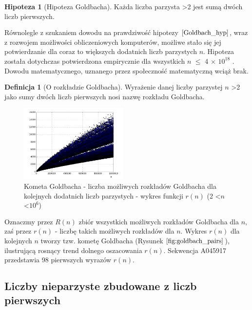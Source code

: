 \documentclass[10pt,onecolumn]{article}
\theoremstyle{definition}
\newtheorem{definition}{Definicja}
\theoremstyle{hypothesis}
\newtheorem{hypothesis}{Hipoteza}
\theoremstyle{capability}
\begin{document}
\begin{hypothesis}[Hipoteza Goldbacha]
Każda liczba parzysta \textgreater 2 jest sumą dwóch liczb pierwszych.
\label{Goldbach_hyp}
\end{hypothesis}

Równolegle z szukaniem dowodu na prawdziwość hipotezy $\ref{Goldbach_hyp}$, wraz z rozwojem możliwości obliczeniowych komputerów, możliwe stało się jej potwierdzanie dla coraz to większych dodatnich liczb parzystych $n$. Hipoteza została dotychczas potwierdzona empirycznie dla wszystkich $n$ $\leq$ 4 $\times$ $10^{18}$ \cite{oliveira2012}. Dowodu matematycznego, uznanego przez społeczność matematyczną wciąż brak.\par

\begin{definition} [O rozkładzie Goldbacha]
Wyrażenie danej liczby parzystej $n$ \textgreater 2 jako sumy dwóch liczb pierwszych nosi nazwę rozkładu Goldbacha.
\end{definition}

\begin{figure}
  \begin{center}
    \includegraphics[width=0.48\textwidth]{f_goldbach_pairs}
  \end{center}
  \caption{Kometa Goldbacha - liczba możliwych rozkładów Goldbacha dla kolejnych dodatnich liczb parzystych - wykres funkcji $r(n)$ (2 \textless $n$ \textless $10^6$)}
  \label{fig:goldbach_pairs}
\end{figure}

Oznaczmy przez $R(n)$ zbiór wszystkich możliwych rozkładów Goldbacha dla $n$, zaś przez $r(n)$ - liczbę takich możliwych rozkładów dla $n$. 
Wykres $r(n)$ dla kolejnych $n$ tworzy tzw. kometę Goldbacha (Rysunek $\ref{fig:goldbach_pairs}$), ilustrującą rosnący trend dolnego oszacowania $r(n)$. Sekwencja A045917 przedstawia 98 pierwszych wyrazów $r(n)$.

\subsection{Liczby nieparzyste zbudowane z liczb pierwszych}
\end{document}
